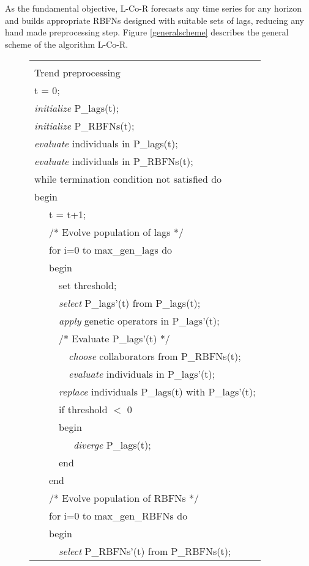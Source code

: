 \documentclass[a4paper,twoside]{article}
\newcommand{\metodo}{L-Co-R}
\begin{document}
As the fundamental objective, {\metodo} forecasts any time series for any horizon and builds appropriate RBFNs designed with suitable sets of lags, reducing any hand made preprocessing step. Figure \ref{generalscheme} describes the general scheme of the algorithm {\metodo}.

\begin{figure}
\centering
\begin{tabular}{|l|}
\hline
\\
Trend preprocessing \\
t = 0;  \\
\emph{initialize} P\_lags(t); \\
\emph{initialize} P\_RBFNs(t);  \\
\emph{evaluate} individuals in P\_lags(t); \\
\emph{evaluate} individuals in P\_RBFNs(t); \\
while termination condition not satisfied do \\
begin  \\
\ \ \ t = t+1;  \\
\ \ \ /* Evolve population of lags */ \\
\ \ \ for i=0 to max\_gen\_lags do \\
\ \ \ begin  \\
\ \ \ \ \ set threshold;  \\
\ \ \ \ \ \emph{select} P\_lags'(t) from P\_lags(t); \\
\ \ \ \ \ \emph{apply} genetic operators in P\_lags'(t); \\
\ \ \ \ \ /* Evaluate P\_lags'(t) */ \\
\ \ \ \ \ \ \ \emph{choose} collaborators from P\_RBFNs(t); \\
\ \ \ \ \ \ \ \emph{evaluate} individuals in P\_lags'(t); \\
\ \ \ \ \ \emph{replace} individuals P\_lags(t) with P\_lags'(t); \\
\ \ \ \ \ if threshold $<$ 0  \\
\ \ \ \ \ begin  \\
\ \ \ \ \ \ \ \ \emph{diverge} P\_lags(t); \\
\ \ \ \ \ end \\
\ \ \ end  \\
\ \ \ /* Evolve population of RBFNs */ \\
\ \ \ for i=0 to max\_gen\_RBFNs do \\
\ \ \ begin \\
\ \ \ \ \ \emph{select} P\_RBFNs'(t) from P\_RBFNs(t); \\

\end{tabular}
\end{figure}
\end{document}
